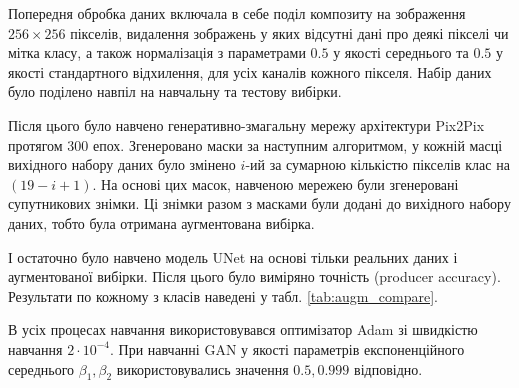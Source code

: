 \documentclass{ConfFTI}
\begin{document}
Попередня обробка даних включала в себе поділ композиту на
зображення $256 \times 256$ пікселів, видалення зображень у яких
відсутні дані про деякі пікселі чи мітка класу, а також нормалізація з
параметрами $0.5$ у якості середнього та $0.5$ у якості стандартного відхилення,
для усіх каналів кожного пікселя. Набір даних було поділено навпіл
на навчальну та тестову вибірки.

Після цього було навчено генеративно-змагальну мережу архітектури
Pix2Pix протягом 300 епох. Згенеровано маски за наступним алгоритмом,
у кожній масці вихідного набору даних було змінено $i$-ий за сумарною кількістю
пікселів клас на $(19 - i + 1)$. На основі цих масок, навченою мережею
були згенеровані супутникових знімки. Ці знімки разом з масками були
додані до вихідного набору даних, тобто була отримана аугментована вибірка.

І остаточно було навчено модель UNet \cite{unet} на основі тільки реальних даних
і аугментованої вибірки. Після цього було виміряно точність (producer accuracy).
Результати по кожному з класів наведені у табл. \ref{tab:augm_compare}.

В усіх процесах навчання використовувався оптимізатор Adam \cite{diederik2014adam}
зі швидкістю навчання $2 \cdot 10^{-4}$. При навчанні GAN у якості параметрів
експоненційного середнього $\beta_1, \beta_2$ використовувались
значення $0.5, 0.999$ відповідно.
\end{document}
